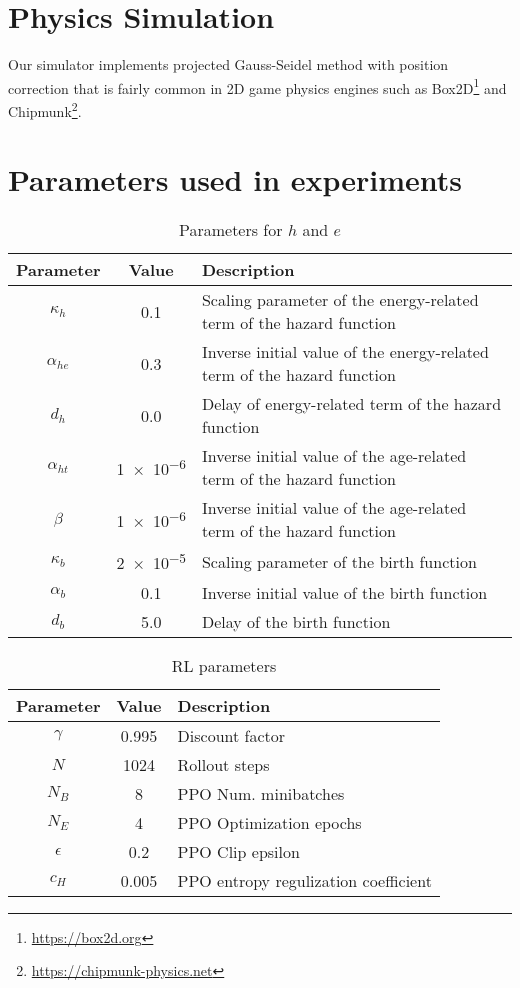 \section{Physics Simulation}\label{ap:phys}
Our simulator implements projected Gauss-Seidel method with position correction \citep{catto2005iterative} that is fairly common in 2D game physics engines such as Box2D\footnote{\url{https://box2d.org}} and Chipmunk\footnote{\url{https://chipmunk-physics.net}}.

\section{Parameters used in experiments}\label{ap:param}

\begin{table}[t]
  \centering
  \caption{Parameters for $h$ and $e$}\label{tab:bd-param}
  \begin{tabular}{ccl}
  \toprule
    Parameter & Value & Description \\
    \midrule
    $\kappa_{h}$ & 0.1 & Scaling parameter of the energy-related term of the hazard function \\
    $\alpha_{he}$ & 0.3 & Inverse initial value of the energy-related term of the hazard function \\
    $d_{h}$ & 0.0 & Delay of energy-related term of the hazard function \\
    $\alpha_{ht}$ & \num{1e-6} & Inverse initial value of the age-related term of the hazard function \\
    $\beta$ & \num{1e-6} & Inverse initial value of the age-related term of the hazard function \\
    $\kappa_{b}$ & \num{2e-5} & Scaling parameter of the birth function\\
    $\alpha_{b}$ & 0.1 & Inverse initial value of the birth function \\
    $d_{b}$ & 5.0 & Delay of the birth function \\
    \bottomrule
  \end{tabular}
\end{table}

\begin{table}[t]
  \centering
  \caption{RL parameters}\label{tab:rl-param}
  \begin{tabular}{ccl}
  \toprule
    Parameter & Value & Description \\
    \midrule
    $\gamma$ & 0.995 & Discount factor \\
    $N$ & 1024 & Rollout steps \\
    $N_{B}$ & 8 & PPO Num. minibatches \\
    $N_{E}$ & 4 & PPO Optimization epochs \\
    $\epsilon$ & 0.2 & PPO Clip epsilon \\
    $c_{H}$ & 0.005 & PPO entropy regulization coefficient \\
  \end{tabular}
\end{table}
